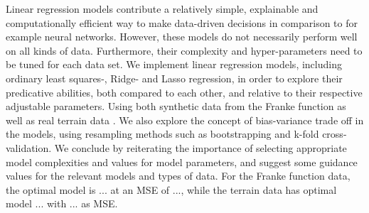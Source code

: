 Linear regression models contribute a relatively simple, explainable and computationally efficient way to make data-driven decisions in comparison to for example neural networks.
However, these models do not necessarily perform well on all kinds of data.
Furthermore, their complexity and hyper-parameters need to be tuned for each data set.
We implement linear regression models, including ordinary least squares-, Ridge- and Lasso regression, in order to explore their predicative abilities, both compared to each other, and relative to their respective adjustable parameters. 
Using both synthetic data from the Franke function \citep[p. 13]{frank} as well as real terrain data \cite{mortengithub}.
We also explore the concept of bias-variance trade off in the models, using resampling methods such as bootstrapping and k-fold cross-validation. 
We conclude by reiterating the importance of selecting appropriate model complexities and values for model parameters, and suggest some guidance values for the relevant models and types of data. 
For the Franke function data, the optimal model is ... at an MSE of ..., while the terrain data has optimal model ... with ... as MSE. 
